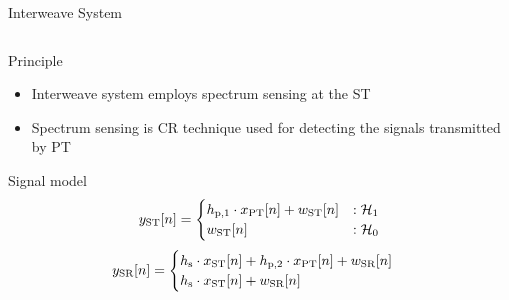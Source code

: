 \documentclass[16pt]{beamer}
\newcommand{\fs}[2]{\fontsize{#1 pt}{#2}\selectfont}
\begin{document}
\begin{frame}[t]{Interweave System}
	\vspace{-2mm}
	\fs{7}{8}
	\begin{columns}
		\begin{column}{0.44\columnwidth}
			\begin{block}{\scriptsize Principle} %
				\begin{itemize}
					\item Interweave system employs spectrum sensing at the ST 
					\item Spectrum sensing is CR technique used for detecting the signals transmitted by PT
				\end{itemize}
			\end{block}
			\vspace{-1mm}
			{
				\begin{block}{\scriptsize Signal model} %
				\begin{equation*}
					y_{\text{ST}}[n] = 
					\begin{cases}
					h_{\text{p,1}} \cdot x_{\text{PT}}[n] + w_{\text{ST}}[n] & : \mathcal{H}_1 \\
					w_{\text{ST}}[n] & :\mathcal{H}_0
					\end{cases}
				\end{equation*}
				\begin{equation*}
					\ys[n] = 
					\begin{cases}
						\hs \cdot \xs[n] + \hpt \cdot \xp[n] +  \wsr[n] & \\%
						\hs \cdot \xs[n] + \wsr[n] & %
					\end{cases}
					\label{eq_IS:sys_mod_ss}
				\end{equation*}
				\end{block}
			}
			{
			
}
\end{column}
\end{columns}
\end{frame}
\end{document}
